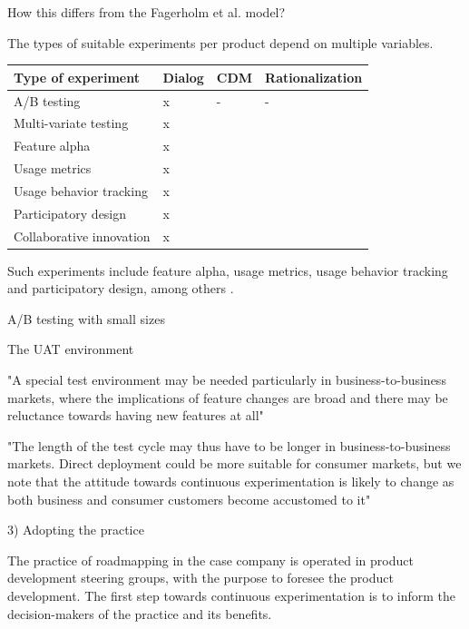 \documentclass[english]{tktltiki2}
\theoremstyle{definition}
\theoremstyle{remark}
\begin{document}
How this differs from the Fagerholm et al. model?


The types of suitable experiments per product depend on multiple variables.
 
\begin{center}
    \begin{tabular}{ | l | l | l | p{5cm}}
    \hline
    \textbf{Type of experiment} & \textbf{Dialog} & \textbf{CDM} & \textbf{Rationalization} \\ \hline
	A/B testing & x & - & - \\ \hline
	Multi-variate testing & x & & \\ \hline
	Feature alpha & x & & \\ \hline
	Usage metrics & x & & \\ \hline
	Usage behavior tracking & x & & \\ \hline
	Participatory design & x & & \\ \hline
	Collaborative innovation & x & & \\ \hline
	\end{tabular}
\end{center}

Such experiments include feature alpha, usage metrics, usage behavior tracking and participatory design, among others \cite{bosch2012building}.

A/B testing with small sizes %

The UAT environment

"A special test environment may be needed particularly in business-to-business markets, where the implications of feature changes are broad and there may be reluctance towards having new features at all"


"The length of the test cycle may thus have to be longer in business-to-business markets. Direct deployment could be more suitable for consumer markets, but we note that the attitude towards continuous experimentation is likely to change as both business and consumer customers become accustomed to it"


3) Adopting the practice

The practice of roadmapping in the case company is operated in product development steering groups, with the purpose to foresee the product development. The first step towards continuous experimentation is to inform the decision-makers of the practice and its benefits. 
\end{document}
